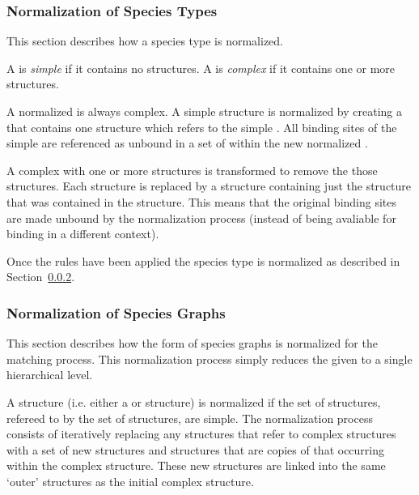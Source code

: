 \documentclass{cekarticle}
\begin{document}
\subsubsection{Normalization of Species Types}
\label{sec:trans-type}

This section describes how a species type is normalized.

A  is \emph{simple} if it contains no  structures.
A  is \emph{complex} if it contains one or more  structures.

A normalized  is always complex.
A simple  structure is normalized by creating a 
that contains one  structure which refers to the simple .
All binding sites of the simple  are referenced as unbound in a set of
 within the new normalized .

A complex  with one or more  structures is transformed
to remove the those structures.  Each  structure is replaced by a
 structure containing just the  structure
that was contained in the  structure.  This means that the original
binding sites are made unbound by the normalization process
(instead of being avaliable for binding in a different context).

Once the rules have been applied the species type is normalized as
described in Section~\ref{sec:norm-graphs}.

\subsubsection{Normalization of Species Graphs}
\label{sec:norm-graphs}

This section describes how the form of species graphs is
normalized for the matching process.  This normalization process
simply reduces the given  to a single
hierarchical level.

A  structure (i.e. either a
 or  structure) is
normalized if the set of  structures, refereed
to by the set of  structures, are
simple. The normalization process consists of iteratively
replacing any  structures that refer to
complex  structures with a set of new
 structures and 
structures that are copies of that occurring within the complex
 structure.  These new structures are linked
into the same `outer'  structures as the initial
complex  structure.
\end{document}
